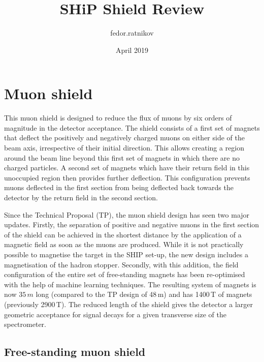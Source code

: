 \documentclass{article}
\title{SHiP Shield Review}
\author{fedor.ratnikov }
\date{April 2019}
\begin{document}
\maketitle

\section{Muon shield}

This muon shield is designed to reduce the flux of muons by six orders of magnitude 
in the detector acceptance. The shield consists of a first set of magnets that deflect the 
positively and negatively 
charged muons on either side of the beam axis, irrespective of their initial 
direction. This allows creating a region around the beam line beyond this first set of 
magnets in which there are no charged particles. A second set of magnets which have 
their return field in this unoccupied region then provides further deflection. This 
configuration prevents muons deflected in the first section from being deflected back 
towards the detector by the return field in the second section.  

Since the Technical Proposal (TP), the muon shield design has seen two major updates.
Firstly, the separation of positive and negative muons in the first section of the shield 
can be achieved in the shortest distance by the application of a magnetic field as 
soon as the muons are produced. While it is not practically possible to magnetise 
the target in the SHIP set-up, the new design includes a magnetisation of the hadron
stopper. Secondly, with this addition, the field configuration of the entire set of 
free-standing magnets has been re-optimised with the help of machine learning techniques.
The resulting system of magnets is now $35\,m$ long (compared to the TP design of 48\,m) 
and has 1400\,T of magnets (previously 2900\,T). 
The reduced length of the shield gives the detector a larger geometric acceptance for 
signal decays for a given transverse size of the spectrometer. 

\subsection{Free-standing muon shield}
\end{document}
